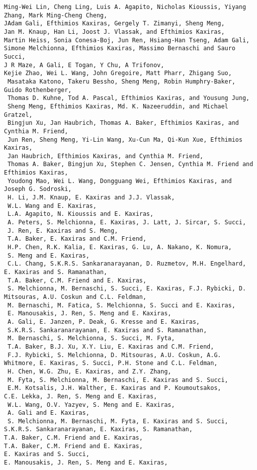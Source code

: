 \documentclass[11pt]{article}
\begin{document}
    \begin{Verbatim}[commandchars=\\\{\}]
Ming-Wei Lin, Cheng Ling, Luis A. Agapito, Nicholas Kioussis, Yiyang Zhang, Mark Ming-Cheng Cheng,
JAdam Gali, Efthimios Kaxiras, Gergely T. Zimanyi, Sheng Meng,
Jan M. Knaup, Han Li, Joost J. Vlassak, and Efthimios Kaxiras,
Martin Heiss, Sonia Conesa-Boj, Jun Ren, Hsiang-Han Tseng, Adam Gali,
Simone Melchionna, Efthimios Kaxiras, Massimo Bernaschi and Sauro Succi,
J R Maze, A Gali, E Togan, Y Chu, A Trifonov,
Kejie Zhao, Wei L. Wang, John Gregoire, Matt Pharr, Zhigang Suo,
 Masataka Katono, Takeru Bessho, Sheng Meng, Robin Humphry-Baker, Guido Rothenberger,
 Thomas D. Kuhne, Tod A. Pascal, Efthimios Kaxiras, and Yousung Jung,
 Sheng Meng, Efthimios Kaxiras, Md. K. Nazeeruddin, and Michael Gratzel,
 Bingjun Xu, Jan Haubrich, Thomas A. Baker, Efthimios Kaxiras, and Cynthia M. Friend,
 Jun Ren, Sheng Meng, Yi-Lin Wang, Xu-Cun Ma, Qi-Kun Xue, Efthimios Kaxiras,
 Jan Haubrich, Efthimios Kaxiras, and Cynthia M. Friend,
 Thomas A. Baker, Bingjun Xu, Stephen C. Jensen, Cynthia M. Friend and Efthimios Kaxiras,
 Youdong Mao, Wei L. Wang, Dongguang Wei, Efthimios Kaxiras, and Joseph G. Sodroski,
 H. Li, J.M. Knaup, E. Kaxiras and J.J. Vlassak,
 W.L. Wang and E. Kaxiras,
 L.A. Agapito, N. Kioussis and E. Kaxiras,
 A. Peters, S. Melchionna, E. Kaxiras, J. Latt, J. Sircar, S. Succi,
 J. Ren, E. Kaxiras and S. Meng,
 T.A. Baker, E. Kaxiras and C.M. Friend,
 H.P. Chen, R.K. Kalia, E. Kaxiras, G. Lu, A. Nakano, K. Nomura,
 S. Meng and E. Kaxiras,
 C.L. Chang, S.K.R.S. Sankaranarayanan, D. Ruzmetov, M.H. Engelhard, E. Kaxiras and S. Ramanathan,
 T.A. Baker, C.M. Friend and E. Kaxiras,
 S. Melchionna, M. Bernaschi, S. Succi, E. Kaxiras, F.J. Rybicki, D. Mitsouras, A.U. Coskun and C.L. Feldman,
 M. Bernaschi, M. Fatica, S. Melchionna, S. Succi and E. Kaxiras,
 E. Manousakis, J. Ren, S. Meng and E. Kaxiras,
 A. Gali, E. Janzen, P. Deak, G. Kresse and E. Kaxiras,
 S.K.R.S. Sankaranarayanan, E. Kaxiras and S. Ramanathan,
 M. Bernaschi, S. Melchionna, S. Succi, M. Fyta,
 T.A. Baker, B.J. Xu, X.Y. Liu, E. Kaxiras and C.M. Friend,
 F.J. Rybicki, S. Melchionna, D. Mitsouras, A.U. Coskun, A.G. Whitmore, E. Kaxiras, S. Succi, P.H. Stone and C.L. Feldman,
 H. Chen, W.G. Zhu, E. Kaxiras, and Z.Y. Zhang,
 M. Fyta, S. Melchionna, M. Bernaschi, E. Kaxiras and S. Succi,
 E.M. Kotsalis, J.H. Walther, E. Kaxiras and P. Koumoutsakos,
C.E. Lekka, J. Ren, S. Meng and E. Kaxiras,
 W.L. Wang, O.V. Yazyev, S. Meng and E. Kaxiras,
 A. Gali and E. Kaxiras,
 S. Melchionna, M. Bernaschi, M. Fyta, E. Kaxiras and S. Succi,
S.K.R.S. Sankaranarayanan, E. Kaxiras, S. Ramanathan,
T.A. Baker, C.M. Friend and E. Kaxiras,
T.A. Baker, C.M. Friend and E. Kaxiras,
E. Kaxiras and S. Succi,
E. Manousakis, J. Ren, S. Meng and E. Kaxiras,

    \end{Verbatim}
\end{document}
